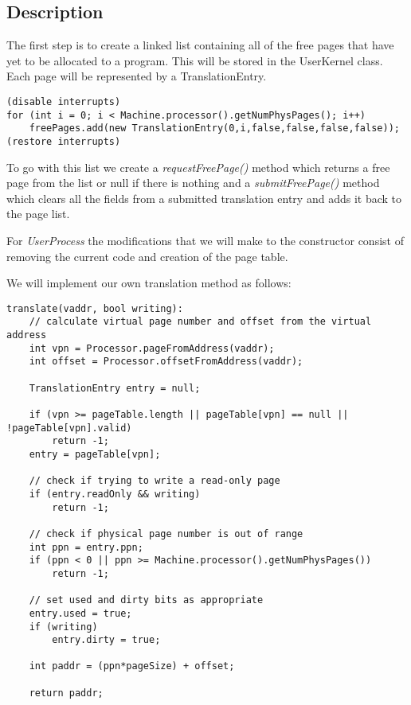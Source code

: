 \documentclass{article}
\begin{document}
\subsection*{Description}

The first step is to create a linked list containing all of the free pages that
have yet to be allocated to a program. This will be stored in the UserKernel
class. Each page will be represented by a TranslationEntry.

\begin{verbatim} 
(disable interrupts)
for (int i = 0; i < Machine.processor().getNumPhysPages(); i++)
    freePages.add(new TranslationEntry(0,i,false,false,false,false));
(restore interrupts)
\end{verbatim}

To go with this list we create a \textit{requestFreePage()} method which returns a free
page from the list or null if there is nothing and a \textit{submitFreePage()} method
which clears all the fields from a submitted translation entry and adds it back
to the page list.

For \textit{UserProcess} the modifications that we will make to the constructor consist
of removing the current code and creation of the page table.

We will implement our own translation method as follows:
\begin{verbatim}
translate(vaddr, bool writing):
    // calculate virtual page number and offset from the virtual address
    int vpn = Processor.pageFromAddress(vaddr);
    int offset = Processor.offsetFromAddress(vaddr);

    TranslationEntry entry = null;

    if (vpn >= pageTable.length || pageTable[vpn] == null || !pageTable[vpn].valid)
        return -1;
    entry = pageTable[vpn];

    // check if trying to write a read-only page
    if (entry.readOnly && writing)
        return -1;

    // check if physical page number is out of range
    int ppn = entry.ppn;
    if (ppn < 0 || ppn >= Machine.processor().getNumPhysPages())
        return -1;

    // set used and dirty bits as appropriate
    entry.used = true;
    if (writing)
        entry.dirty = true;

    int paddr = (ppn*pageSize) + offset;

    return paddr;
\end{verbatim}
\end{document}
